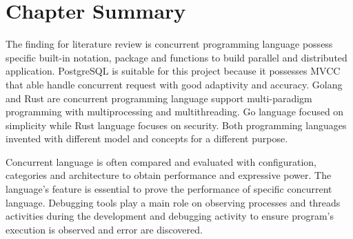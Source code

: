 \pagebreak

\section{Chapter Summary}

The finding for literature review is concurrent programming language possess specific built-in notation, package and functions to build parallel and distributed application. PostgreSQL is suitable for this project because it possesses MVCC that able handle concurrent request with good adaptivity and accuracy. Golang and Rust are concurrent programming language support multi-paradigm programming with multiprocessing and multithreading. Go language focused on simplicity while Rust language focuses on security. Both programming languages invented with different model and concepts for a different purpose.

Concurrent language is often compared and evaluated with configuration, categories and architecture to obtain performance and expressive power. The language's feature is essential to prove the performance of specific concurrent language. Debugging tools play a main role on observing processes and threads activities during the development and debugging activity to ensure program's execution is observed and error are discovered. 

